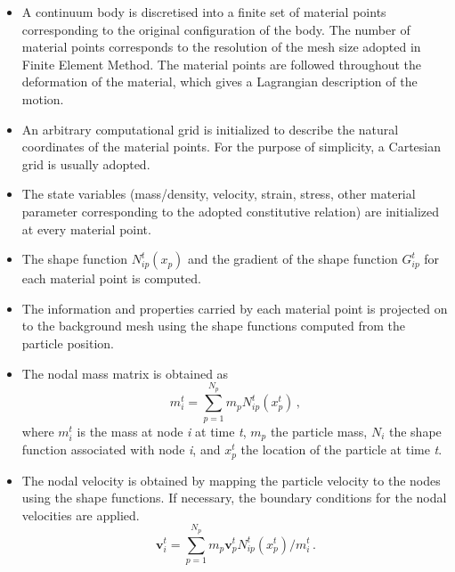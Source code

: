 \begin{itemize}

\item
A continuum body is discretised into a finite set of material points 
corresponding to the original configuration of the body. The number of material 
points corresponds to the resolution of the mesh size adopted in Finite Element 
Method. The material points are followed throughout the deformation of the 
material, which gives a Lagrangian description of the motion. 

\item
An arbitrary computational grid is initialized to describe the natural 
coordinates of the material points. For the purpose of simplicity, a Cartesian 
grid is usually adopted. 

\item
The state variables (mass/density, velocity, strain, stress, other material 
parameter corresponding to the adopted constitutive relation) are initialized 
at every material point. 

\item
The shape function $N_{ip}^t(x_p)$ and the gradient of the shape function 
$G_{ip}^t$ for each material point is computed.

\item
The information and properties carried by each material point is projected on 
to the background mesh using the shape functions computed from the 
particle position. 

\item
The nodal mass matrix is obtained as
%
\begin{equation}
\mathit{m}_{\mathit{i}}^{\mathit{t}} = 
\sum\limits_{\mathit{p}=1}^{\mathit{N}_{\mathit{p}}} \mathit{m}_{\mathit{p}} 
\mathit{N}_{\mathit{ip}}^{\mathit{t}}(x^t_p) \,,
\end{equation}
%
where $\mathit{m}_{i}^{t}$ is the mass at node \textit{i} at time \textit{t}, 
$\mathit{m}_{\mathit{p}}$ the particle mass, $\mathit{N}_{\mathit{i}}$ the 
shape function associated with node \textit{i}, and 
$\mathit{x}_{\mathit{p}}^{\mathit{t}}$ the location of the particle at time
\textit{t}.

\item
The nodal velocity is obtained by mapping the particle velocity to the nodes 
using the shape functions. If necessary, the boundary conditions
for the nodal velocities are applied.
%
\begin{equation}
\mathbf{v}_{\mathit{i}}^{\mathit{t}} = 
\sum\limits_{\mathit{p}=1}^{\mathit{N}_{\mathit{p}}} \mathit{m}_{\mathit{p}} 
\mathbf{v}_{\mathit{p}}^{\mathit{t}} 
\mathbf{\mathit{N}}_{\mathit{ip}}^{\mathit{t}} (x^t_p) / 
\mathit{m}_{\mathit{i}}^{\mathit{t}} \,.
\end{equation}


\end{itemize}
